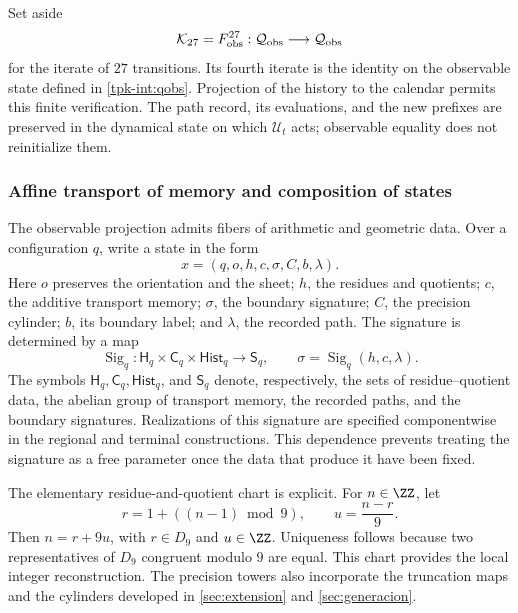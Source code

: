 Set aside
\[
 \mathcal K_{27}=F_{\rm obs}^{27}:
 \mathcal Q_{\rm obs}\longrightarrow\mathcal Q_{\rm obs}
\]
for the iterate of \(27\) transitions. Its fourth iterate is the
identity on the observable state defined in \eqref{tpk-int:qobs}.
Projection of the history to the calendar permits this finite
verification. The path record, its evaluations, and
the new prefixes are preserved in the dynamical state on which
\(\mathcal U_t\) acts; observable equality does not reinitialize them.

\subsubsection{Affine transport of memory and composition of states}
\label{tpk-int:memoria}

The observable projection admits fibers of arithmetic and geometric data.
Over a configuration \(q\), write a state in the form
\[
 x=(q,o,h,c,\sigma,C,b,\lambda).
\]
Here \(o\) preserves the orientation and the sheet; \(h\), the residues
and quotients; \(c\), the additive transport memory; \(\sigma\),
the boundary signature; \(C\), the precision cylinder; \(b\), its
boundary label; and \(\lambda\), the recorded path. The
signature is determined by a map
\[
 \operatorname{Sig}_q:
 \mathsf H_q\times\mathsf C_q\times\mathsf{Hist}_q
 \longrightarrow\mathsf S_q,
 \qquad \sigma=\operatorname{Sig}_q(h,c,\lambda).
\]
The symbols \(\mathsf H_q,\mathsf C_q,\mathsf{Hist}_q\), and
\(\mathsf S_q\) denote, respectively, the sets of residue--quotient data,
the abelian group of transport memory, the
recorded paths, and the boundary signatures.
Realizations of this signature are specified componentwise in
the regional and terminal constructions. This dependence prevents treating
the signature as a free parameter once the data that produce it have been fixed.

The elementary residue-and-quotient chart is explicit. For
\(n\in\ZZ\), let
\[
 r=1+((n-1)\bmod9),\qquad u=\frac{n-r}{9}.
\]
Then \(n=r+9u\), with \(r\in D_9\) and \(u\in\ZZ\).
Uniqueness follows because two representatives of \(D_9\) congruent
modulo \(9\) are equal. This chart provides the local integer
reconstruction. The precision towers also incorporate the truncation maps
and the cylinders developed in
\ref{sec:extension} and \ref{sec:generacion}.

